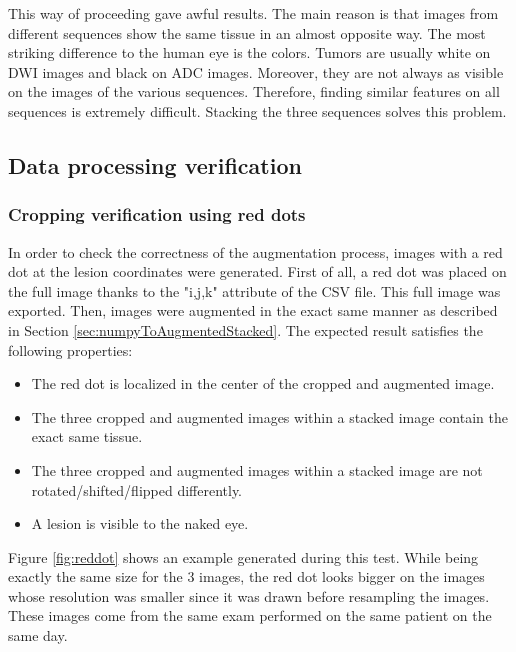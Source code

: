 This way of proceeding gave awful results. The main reason is that images from different sequences show the same tissue in an almost opposite way. The most striking difference to the human eye is the colors. Tumors are usually white on DWI images and black on ADC images. Moreover, they are not always as visible on the images of the various sequences. Therefore, finding similar features on all sequences is extremely difficult. Stacking the three sequences solves this problem. 


\subsection{Data processing verification}
\label{sec:dataProcessingVerification}
\subsubsection{Cropping verification using red dots}
\setlength{\marginparwidth}{3cm}\leavevmode {}In order to check the correctness of the augmentation process, images with a red dot at the lesion coordinates were generated. First of all, a red dot was placed on the full image thanks to the "i,j,k" attribute of the CSV file. This full image was exported. Then, images were augmented in the exact same manner as described in Section \ref{sec:numpyToAugmentedStacked}. The expected result satisfies the following properties:
\begin{itemize}
	\item The red dot is localized in the center of the cropped and augmented image.
	\item The three cropped and augmented images within a stacked image contain the exact same tissue. 
	\item The three cropped and augmented images within a stacked image are not rotated/shifted/flipped differently. 
	\item A lesion is visible to the naked eye. 
\end{itemize}

\noindent Figure \ref{fig:reddot} shows an example generated during this test. While being exactly the same size for the 3 images, the red dot looks bigger on the images whose resolution was smaller since it was drawn before resampling the images. These images come from the same exam performed on the same patient on the same day. 

